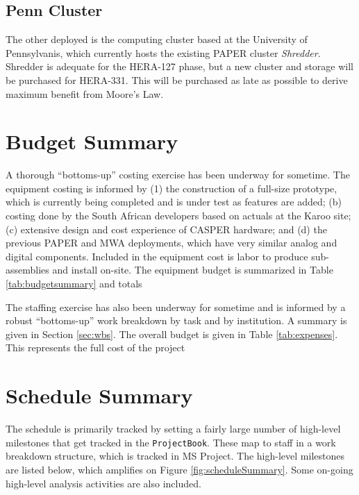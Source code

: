 \documentclass[preprint]{aastex}
\begin{document}
\subsection{Penn Cluster}
The other deployed is the computing cluster based at the University of Pennsylvanis, which currently hosts the existing
PAPER cluster {\em Shredder}.  Shredder is adequate for the HERA-127 phase, but a new cluster and storage will be
purchased for HERA-331.  This will be purchased as late as possible to derive maximum benefit from Moore's Law.



\section{Budget Summary}
\label{sec:budget}
A thorough ``bottoms-up'' costing exercise has been underway for sometime. The
equipment costing is informed by (1) the construction of a full-size prototype, which
is currently being completed and is under test as features are added; (b) costing
done by the South African developers based on actuals at the Karoo site; (c)
extensive design and cost experience of CASPER hardware; and (d) the previous PAPER
and MWA deployments, which have very similar analog and digital components. Included
in the equipment cost is labor to produce sub-assemblies and install on-site. The
equipment budget is summarized in Table \ref{tab:budgetsummary} and totals


The staffing exercise has also been underway for sometime and is informed by a robust
``bottoms-up'' work breakdown by task and by institution. A summary is given in Section \ref{sec:wbs}.
The overall budget is given in Table \ref{tab:expenses}.  This represents the full cost of the project


\section{Schedule Summary}
\label{sec:schedule}
The schedule is primarily tracked by setting a fairly large number of high-level
milestones that get tracked in the {\tt ProjectBook}. These map to staff in a work
breakdown structure, which is tracked in MS Project. The high-level milestones are
listed below, which amplifies on Figure \ref{fig:scheduleSummary}.  Some on-going
high-level analysis activities are also included.
\end{document}
